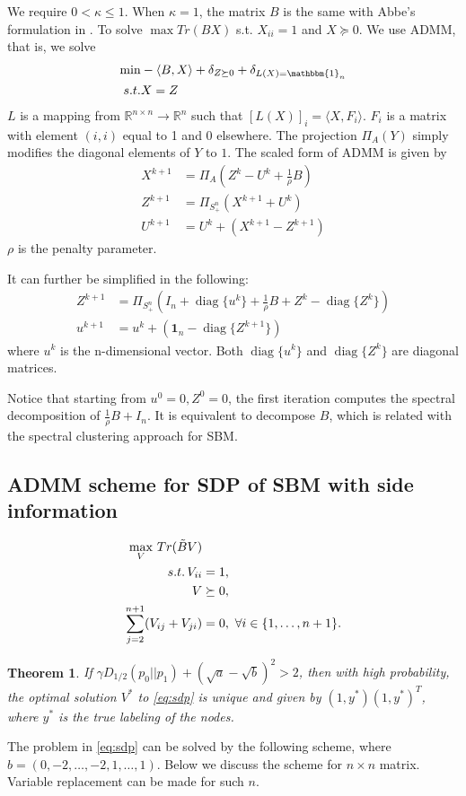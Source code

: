 \documentclass{ctexart}
\newtheorem{theorem}{Theorem}
\DeclareMathOperator{\diag}{diag}
\begin{document}
We require $0<\kappa \leq 1$. When $\kappa = 1$, the matrix $B$ is the same with
Abbe's formulation in \cite{abbe2015exact}.
To solve $\max Tr(BX)$ s.t. $X_{ii} = 1$ and $X \succeq 0$.
We use ADMM, that is, we solve
\begin{align*}
\min & - \langle B, X\rangle + \delta_{Z \succeq 0} + \delta_{L(X) = \mathbbm{1}_n}\\
s.t.& X=Z
\end{align*}
$L$ is a mapping from $\mathbb{R}^{n \times n} \to \mathbb{R}^n$ such that $[L(X)]_i =  \langle X,F_i \rangle $.
$F_i$ is a matrix with element $(i,i)$ equal to 1 and 0 elsewhere.
The projection $\Pi_{A}(Y)$ simply modifies the diagonal elements of $Y$ to $1$.
The scaled form of ADMM \cite{boyd2011distributed} is given by
\begin{align}
X^{k+1} &= \Pi_A(Z^k - U^k + \frac{1}{\rho}B)\label{eq:admm} \\
Z^{k+1} &= \Pi_{S_+^n}(X^{k+1} + U^{k}) \\
U^{k+1} &= U^k + (X^{k+1} - Z^{k+1}) 
\end{align}
$\rho$ is the penalty parameter.

It can further be simplified in the following:
\begin{align}
	Z^{k+1} &= \Pi_{S_+^n}(I_n + \diag\{u^k\} + \frac{1}{\rho} B
	+ Z^k - \diag\{Z^k\}) \\
	u^{k+1} &= u^k + (\mathbf{1}_n - \diag\{Z^{k+1}\}) 
	\end{align}
where $u^k$ is the n-dimensional vector.
Both $\diag\{u^k\}$ and $\diag\{Z^k\}$ are diagonal matrices.

Notice that starting from $u^0=0, Z^0=0$, the first iteration
computes the spectral decomposition of $\frac{1}{\rho}B + I_n$.
It is equivalent to decompose $B$, which is related with
the spectral clustering approach for SBM.

\subsection{ADMM scheme for SDP of SBM with side information}
\begin{align}
		\max_V\, Tr(\tilde{B}V)  &\notag\\
s.t.\, V_{ii} &= 1, \notag\\
V &\succeq 0, \notag\\
\sum_{j=2}^{n+1} (V_{ij} + V_{ji})& = 0,~\forall i\in\{1,\ldots,n+1\}. \label{eq:sdp}
\end{align}

\begin{theorem}\label{thm:sdp}
	If $\gamma D_{1/2}(p_0||p_1)  + (\sqrt{a} - \sqrt{b})^2 > 2$, then with high probability, the optimal solution
	$V^*$ to \eqref{eq:sdp} is unique and given by $(1,y^*)(1,y^*)^T$, where $y^*$ is the true labeling of the nodes.
\end{theorem}
The problem in \eqref{eq:sdp} can be solved by the following scheme, where $b=(0, -2, \dots, -2, 1, \dots, 1)$. Below we discuss the scheme for $n\times n$ matrix. Variable replacement can be made
for such $n$.
\end{document}
